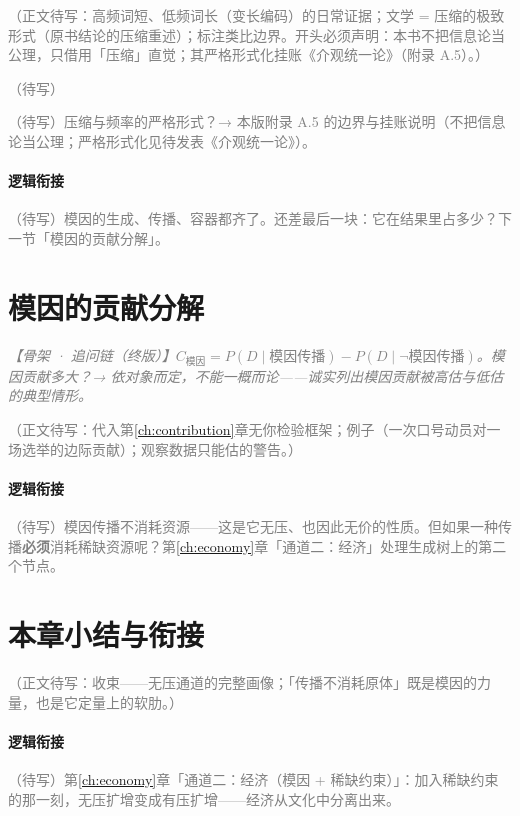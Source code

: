 \documentclass[../../main2.tex]{subfiles}
\begin{document}
	\textcolor{gray}{（正文待写：高频词短、低频词长（变长编码）的日常证据；文学 = 压缩的极致形式（原书结论的压缩重述）；\lowfreq 标注类比边界。开头必须声明：本书不把信息论当公理，只借用「压缩」直觉；其严格形式化挂账《介观统一论》（附录 A.5）。）}

	\begin{readingnote}
		\textcolor{gray}{（待写）}
	\end{readingnote}

	\begin{reader_anticipation}
		\item \textcolor{gray}{（待写）压缩与频率的严格形式？→ 本版附录 A.5 的边界与挂账说明（不把信息论当公理；严格形式化见待发表《介观统一论》）。}
	\end{reader_anticipation}

	\paragraph*{逻辑衔接}
	\textcolor{gray}{（待写）模因的生成、传播、容器都齐了。还差最后一块：它在结果里占多少？下一节「模因的贡献分解」。}

	\section{模因的贡献分解}
	\label{sec:meme-contribution}

	\textcolor{gray}{\textit{【骨架 · 追问链（终版）】$C_{\text{模因}} = P(D \mid \text{模因传播}) - P(D \mid \neg \text{模因传播})$。模因贡献多大？→ 依对象而定，不能一概而论——诚实列出模因贡献被高估与低估的典型情形。}}

	\textcolor{gray}{（正文待写：代入第\ref{ch:contribution}章无你检验框架；例子（一次口号动员对一场选举的边际贡献）；观察数据只能估的警告。）}

	\paragraph*{逻辑衔接}
	\textcolor{gray}{（待写）模因传播不消耗资源——这是它无压、也因此无价的性质。但如果一种传播\textbf{必须}消耗稀缺资源呢？第\ref{ch:economy}章「通道二：经济」处理生成树上的第二个节点。}

	\section{本章小结与衔接}
	\label{sec:meme-summary}

	\textcolor{gray}{（正文待写：收束——无压通道的完整画像；「传播不消耗原体」既是模因的力量，也是它定量上的软肋。）}

	\paragraph*{逻辑衔接}
	\textcolor{gray}{（待写）第\ref{ch:economy}章「通道二：经济（模因 + 稀缺约束）」：加入稀缺约束的那一刻，无压扩增变成有压扩增——经济从文化中分离出来。}
\end{document}
